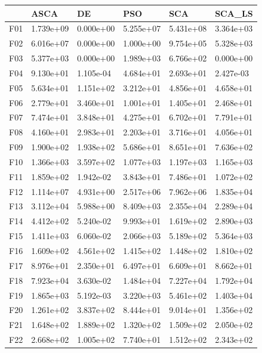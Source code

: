 \begin{tabular}{llllll}
\toprule
{} &       ASCA &         DE &        PSO &        SCA &     SCA\_LS \\
\midrule
F01  &  1.739e+09 &  0.000e+00 &  5.255e+07 &  5.431e+08 &  3.364e+03 \\
F02  &  6.016e+07 &  0.000e+00 &  1.000e+00 &  9.754e+05 &  5.328e+03 \\
F03  &  5.377e+03 &  0.000e+00 &  1.989e+03 &  6.766e+02 &  0.000e+00 \\
F04  &  9.130e+01 &  1.105e-04 &  4.684e+01 &  2.693e+01 &  2.427e-03 \\
F05  &  5.634e+01 &  1.151e+02 &  3.212e+01 &  4.856e+01 &  4.658e+01 \\
F06  &  2.779e+01 &  3.460e+01 &  1.001e+01 &  1.405e+01 &  2.468e+01 \\
F07  &  7.474e+01 &  3.848e+01 &  4.275e+01 &  6.702e+01 &  7.791e+01 \\
F08  &  4.160e+01 &  2.983e+01 &  2.203e+01 &  3.716e+01 &  4.056e+01 \\
F09  &  1.900e+02 &  1.938e+02 &  5.686e+01 &  8.651e+01 &  7.636e+02 \\
F10  &  1.366e+03 &  3.597e+02 &  1.077e+03 &  1.197e+03 &  1.165e+03 \\
F11  &  1.859e+02 &  1.942e-02 &  3.843e+01 &  7.486e+01 &  1.072e+02 \\
F12  &  1.114e+07 &  4.931e+00 &  2.517e+06 &  7.962e+06 &  1.835e+04 \\
F13  &  3.112e+04 &  5.988e+00 &  8.409e+03 &  2.355e+04 &  2.289e+04 \\
F14  &  4.412e+02 &  5.240e-02 &  9.993e+01 &  1.619e+02 &  2.890e+03 \\
F15  &  1.411e+03 &  6.060e-02 &  2.066e+03 &  5.189e+02 &  5.364e+03 \\
F16  &  1.609e+02 &  4.561e+02 &  1.415e+02 &  1.448e+02 &  1.810e+02 \\
F17  &  8.976e+01 &  2.350e+01 &  6.497e+01 &  6.609e+01 &  8.662e+01 \\
F18  &  7.923e+04 &  3.630e-02 &  1.484e+04 &  7.227e+04 &  1.792e+04 \\
F19  &  1.865e+03 &  5.192e-03 &  3.220e+03 &  5.461e+02 &  1.403e+04 \\
F20  &  1.261e+02 &  3.837e+02 &  8.444e+01 &  9.014e+01 &  1.356e+02 \\
F21  &  1.648e+02 &  1.889e+02 &  1.320e+02 &  1.509e+02 &  2.050e+02 \\
F22  &  2.668e+02 &  1.005e+02 &  7.740e+01 &  1.512e+02 &  2.343e+02 \\

\end{tabular}
